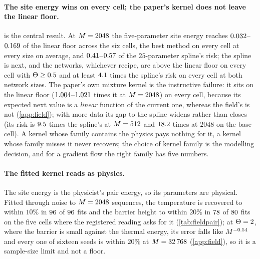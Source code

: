 \paragraph{The site energy wins on every cell; the paper's kernel does not leave the linear floor.}
 is the central result. At $M=2048$ the five-parameter site energy reaches
$0.032$--$0.169$ of the linear floor across the six cells, the best method on every
cell at every size on average, and $0.41$--$0.57$ of the $25$-parameter spline's
risk; the spline is next, and the networks, whichever recipe, are above the linear floor on every cell with
$\Theta\ge0.5$ and at least $4.1$ times the spline's risk on every cell at both network sizes. The paper's own mixture
kernel is the instructive failure: it sits on the linear floor ($1.004$--$1.021$ times it
at $M=2048$) on every cell, because its expected next value is a \emph{linear} function of the current one,
whereas the field's is not (\cref{app:field}); with more data its gap to the spline widens rather than closes (its risk is
$9.5$ times the spline's at $M=512$ and $18.2$ times at $2048$ on the
base cell). A kernel whose family contains the
physics pays nothing for it, a kernel whose family misses it never recovers; the choice of kernel family
is the modelling decision, and for a gradient flow the right family has five numbers.



\paragraph{The fitted kernel reads as physics.}
The site energy is the physicist's pair energy, so its parameters are physical. Fitted through noise to
$M=2048$ sequences, the temperature is recovered to within $10\%$ in $96$ of $96$ fits
and the barrier height to within $20\%$ in $78$ of $80$ fits on the five cells where the
registered reading asks for it (\cref{tab:fieldpair}); at $\Theta=2$, where the barrier is small against the thermal energy, its
error falls like $M^{-0.54}$ and every one of sixteen seeds is within $20\%$ at
$M=32\,768$ (\cref{app:field}), so it is a sample-size limit and not a floor.

